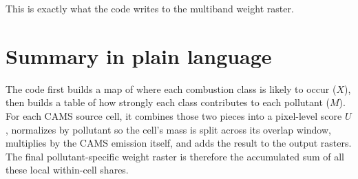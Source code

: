 \documentclass[11pt,a4paper]{article}
\begin{document}
This is exactly what the code writes to the multiband weight raster.

\section{Summary in plain language}

The code first builds a map of where each combustion class is likely to occur
($X$), then builds a table of how strongly each class contributes to each pollutant
($M$). For each CAMS source cell, it combines those two pieces into a pixel-level
score $U$, normalizes by pollutant so the cell's mass is split across its overlap
window, multiplies by the CAMS emission itself, and adds the result to the output
rasters. The final pollutant-specific weight raster is therefore the accumulated sum
of all these local within-cell shares.
\end{document}
